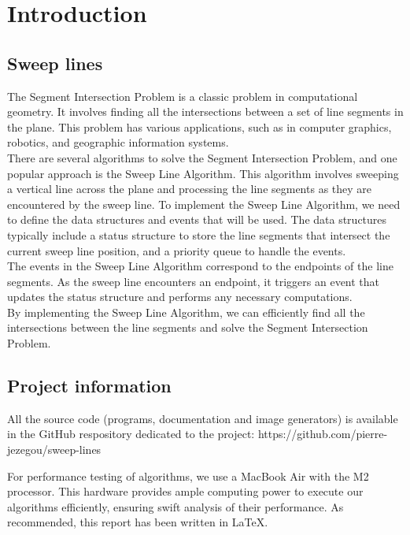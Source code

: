 \documentclass[10pt,a4paper,hidelinks]{article}
\begin{document}

\tableofcontents

\section{Introduction}
\subsection{Sweep lines}
The Segment Intersection Problem is a classic problem in computational geometry. It involves finding all the intersections between a set of line segments in the plane. This problem has various applications, such as in computer graphics, robotics, and geographic information systems.\\

There are several algorithms to solve the Segment Intersection Problem, and one popular approach is the Sweep Line Algorithm. This algorithm involves sweeping a vertical line across the plane and processing the line segments as they are encountered by the sweep line.
To implement the Sweep Line Algorithm, we need to define the data structures and events that will be used. The data structures typically include a status structure to store the line segments that intersect the current sweep line position, and a priority queue to handle the events.\\
The events in the Sweep Line Algorithm correspond to the endpoints of the line segments. As the sweep line encounters an endpoint, it triggers an event that updates the status structure and performs any necessary computations.\\

By implementing the Sweep Line Algorithm, we can efficiently find all the intersections between the line segments and solve the Segment Intersection Problem.


\subsection{Project information}
All the source code (programs, documentation and image generators) is available in the GitHub respository dedicated to the project: https://github.com/pierre-jezegou/sweep-lines

For performance testing of algorithms, we use a MacBook Air with the M2 processor. This hardware provides ample computing power to execute our algorithms efficiently, ensuring swift analysis of their performance. As recommended, this report has been written in \LaTeX.
\end{document}
